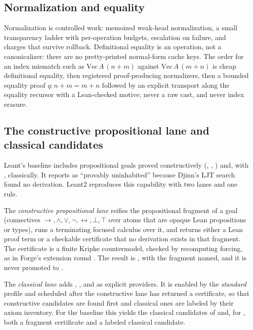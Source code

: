 \subsection{Normalization and equality}

Normalization is controlled work: memoized weak-head normalization, a small transparency ladder with per-operation budgets, escalation on failure, and charges that survive rollback. Definitional equality is an operation, not a canonicalizer: there are no pretty-printed normal-form cache keys. The order for an index mismatch such as $\mathrm{Vec}\,A\,(n+m)$ against $\mathrm{Vec}\,A\,(m+n)$ is cheap definitional equality, then registered proof-producing normalizers, then a bounded equality proof $q : n+m = m+n$ followed by an explicit transport along the equality recursor with a Lean-checked motive; never a raw cast, and never index erasure.

\subsection{The constructive propositional lane and classical candidates}\label{sec:classical}

Leant's baseline includes propositional goals proved constructively (, , ) and, with , classically. It reports  as ``provably uninhabited'' because Djinn's LJT search found no derivation. Leant2 reproduces this capability with two lanes and one rule.

The \emph{constructive propositional lane} reifies the propositional fragment of a goal (connectives $\to,\wedge,\vee,\neg,\leftrightarrow,\bot,\top$ over atoms that are opaque Lean propositions or types), runs a terminating focused calculus over it, and returns either a Lean proof term or a checkable certificate that no derivation exists in that fragment. The certificate is a finite Kripke countermodel, checked by recomputing forcing, as in Forge's extension round \cite{forge}. The result is , with the fragment named, and it is never promoted to .

The \emph{classical lane} adds , , and  as explicit providers. It is enabled by the \emph{standard} profile and scheduled after the constructive lane has returned a certificate, so that constructive candidates are found first and classical ones are labeled by their axiom inventory. For the baseline this yields the classical candidates of  and, for , both a fragment certificate and a labeled classical candidate.

